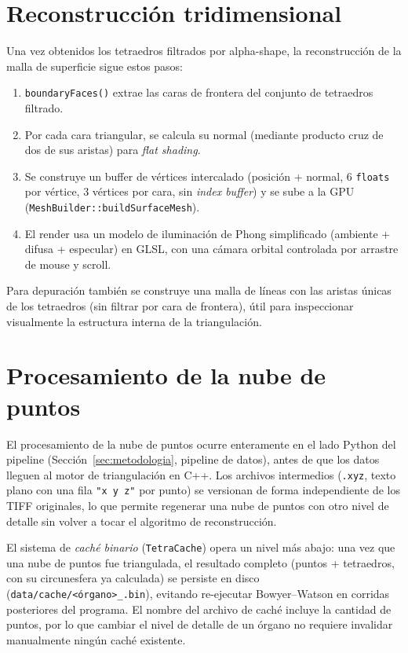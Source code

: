 \documentclass[12pt,a4paper]{article}
\begin{document}
\section{Reconstrucción tridimensional}

Una vez obtenidos los tetraedros filtrados por alpha-shape, la
reconstrucción de la malla de superficie sigue estos pasos:

\begin{enumerate}
    \item \texttt{boundaryFaces()} extrae las caras de frontera del
    conjunto de tetraedros filtrado.
    \item Por cada cara triangular, se calcula su normal (mediante
    producto cruz de dos de sus aristas) para \emph{flat shading}.
    \item Se construye un buffer de vértices intercalado
    (posición + normal, 6 \texttt{floats} por vértice, 3 vértices por
    cara, sin \emph{index buffer}) y se sube a la GPU
    (\texttt{MeshBuilder::buildSurfaceMesh}).
    \item El render usa un modelo de iluminación de Phong simplificado
    (ambiente + difusa + especular) en GLSL, con una cámara orbital
    controlada por arrastre de mouse y scroll.
\end{enumerate}

Para depuración también se construye una malla de líneas con las
aristas \'unicas de los tetraedros (sin filtrar por cara de frontera),
útil para inspeccionar visualmente la estructura interna de la
triangulación.

\section{Procesamiento de la nube de puntos}

El procesamiento de la nube de puntos ocurre enteramente en el lado
Python del pipeline (Sección~\ref{sec:metodologia}, pipeline de datos),
antes de que los datos lleguen al motor de triangulación en C++. Los
archivos intermedios (\texttt{.xyz}, texto plano con una fila
\texttt{"x y z"} por punto) se versionan de forma independiente de los
TIFF originales, lo que permite regenerar una nube de puntos con otro
nivel de detalle sin volver a tocar el algoritmo de reconstrucción.

El sistema de \emph{caché binario} (\texttt{TetraCache}) opera un nivel
más abajo: una vez que una nube de puntos fue triangulada, el resultado
completo (puntos + tetraedros, con su circunesfera ya calculada) se
persiste en disco (\texttt{data/cache/<órgano>\_<N puntos>.bin}),
evitando re-ejecutar Bowyer--Watson en corridas posteriores del
programa. El nombre del archivo de caché incluye la cantidad de puntos,
por lo que cambiar el nivel de detalle de un órgano no requiere
invalidar manualmente ningún caché existente.
\end{document}
